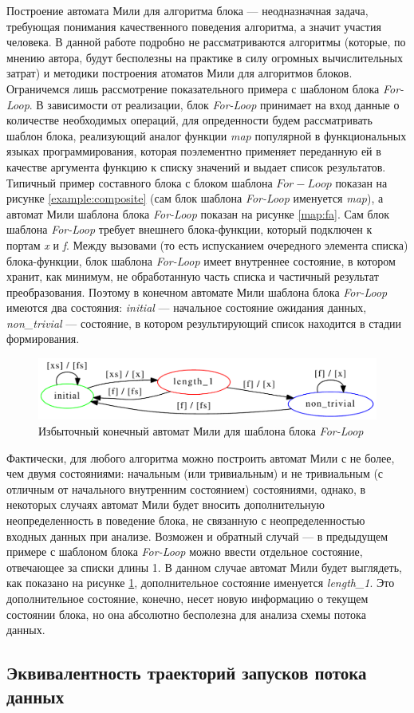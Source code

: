\documentclass[10pt,a4paper]{article}
\begin{document}
Построение автомата Мили для алгоритма блока --- неодназначная задача, требующая понимания качественного поведения алгоритма, а значит участия человека. В данной работе подробно не рассматриваются алгоритмы (которые, по мнению автора, будут бесполезны на практике в силу огромных вычислительных затрат) и методики построения атоматов Мили для алгоритмов блоков. Ограничемся лишь рассмотрение показательного примера с шаблоном блока \textit{For-Loop}. В зависимости от реализации, блок \textit{For-Loop} принимает на вход данные о количестве необходимых операций, для опреденности будем рассматривать шаблон блока, реализующий аналог функции \textit{map} популярной в функциональных языках программирования,
которая поэлементно применяет переданную ей в качестве аргумента функцию к списку значений и выдает список результатов. Типичный пример составного блока с блоком шаблона $For-Loop$ показан на рисунке \ref{example:composite} (сам блок шаблона \textit{For-Loop} именуется \textit{map}), а автомат Мили шаблона блока \textit{For-Loop}
показан на рисунке \ref{map:fa}. Сам блок шаблона \textit{For-Loop} требует внешнего блока-функции, который подключен к портам \textit{x} и \textit{f}.
Между вызовами (то есть испусканием очередного элемента списка) блока-функции, блок шаблона \textit{For-Loop} имеет внутреннее состояние, в котором хранит, как минимум,
не обработанную часть списка и частичный результат преобразования. Поэтому в конечном автомате Мили шаблона блока \textit{For-Loop} имеются два состояния:
\textit{initial} --- начальное состояние ожидания данных, \textit{non\_trivial} --- состояние, в котором результирующий список находится в стадии формирования.

\begin{figure}
    \centering
    \includegraphics[width=\textwidth]{map_extra_fa.pdf}
    \caption{Избыточный конечный автомат Мили для шаблона блока \textit{For-Loop}}
    \label{map:extra_fa}
\end{figure}

Фактически, для любого алгоритма можно построить автомат Мили с не более, чем двумя состояниями: начальным (или тривиальным) и не тривиальным (с отличным от начального внутренним
состоянием) состояниями, однако, в некоторых случаях автомат Мили будет вносить дополнительную неопределенность в поведение блока, не связанную с неопределенностью
входных данных при анализе. Возможен и обратный случай --- в предыдущем примере с шаблоном блока \textit{For-Loop} можно ввести отдельное состояние, отвечающее за списки длины 1.
В данном случае автомат Мили будет выглядеть, как показано на рисунке \ref{map:extra_fa}, дополнительное состояние именуется \textit{length\_1}. Это дополнительное состояние, конечно,
несет новую информацию о текущем состоянии блока, но она абсолютно бесполезна для анализа схемы потока данных.

\subsection{Эквивалентность траекторий запусков потока данных}
\end{document}
